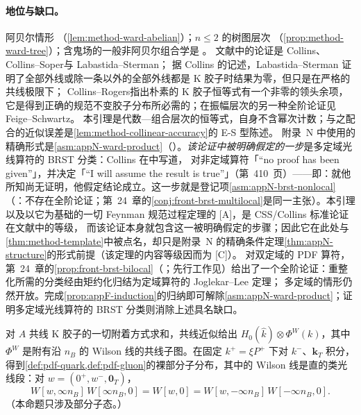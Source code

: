 \paragraph{地位与缺口。}阿贝尔情形 \tagR（\cref{lem:method-ward-abelian}）；$n\le2$ 的树图层次 \tagR（\cref{prop:method-ward-tree}）；含鬼场的一般非阿贝尔组合学是 \tagA。
文献中的论证是 Collins\cite[第~11.9~节，第~416~页，图~11.6]{Collins2011}、Collins--Soper\cite{CollinsSoper1982a}与 Labastida--Sterman\cite{Labastida:1984gy}；
据 Collins 的记述，Labastida--Sterman 证明了全部外线或除一条以外的全部外线都是 K 胶子时结果为零，但只是在严格的共线极限下；
Collins--Rogers\cite{Collins:2008sg}指出朴素的 K 胶子恒等式有一个非零的领头余项，它是得到正确的规范不变胶子分布所必需的；在振幅层次的另一种全阶论证见 Feige--Schwartz\cite{FeigeSchwartz2014}。
本引理是代数—组合层次的恒等式，自身不含幂次计数；与之配合的近似误差是\cref{lem:method-collinear-accuracy}的 E-S 型陈述。
附录~N 中使用的精确形式是\cref{asm:appN-ward-product}（\tagA）。\emph{该论证中被明确假定的一步}是多定域光线算符的 BRST 分类：Collins 在\cite[第~11.3.2~节，第~407--410~页]{Collins2011}中写道，
对非定域算符「“no proof has been given”」，并决定「“I will assume the result is true”」（第~410~页）——即：就他所知尚无证明，他假定结论成立。这一步就是登记项\cref{asm:appN-brst-nonlocal}
（\tagC：不存在全阶论证；第~24~章的\cref{conj:front-brst-multilocal}是同一主张）。本引理以及以它为基础的一切 Feynman 规范过程定理的 [A]，是 CSS/Collins 标准论证在文献中的等级，
而该论证本身就包含这一被明确假定的步骤；因此它在此处与\cref{thm:method-template}中被点名，却只是附录~N 的精确条件定理\cref{thm:appN-structure}的形式前提（该定理的内容等级因而为 [C]）。
对双定域的 PDF 算符，第~24~章的\cref{prop:front-brst-bilocal}（\tagA；先行工作见\cite{Braun:2019qtp}）给出了一个全阶论证：重整化所需的分类经由矩约化归结为定域算符的 Joglekar--Lee 定理；
多定域的情形仍然开放。完成\cref{prop:appF-induction}的归纳即可解除\cref{asm:appN-ward-product}；证明多定域光线算符的 BRST 分类则消除上述具名缺口。

\begin{proposition}\label{prop:method-collinear-wilson}
对 $A$ 共线 K 胶子的一切附着方式求和，共线近似给出 $H_0(\hat k)\otimes\Phi^W(k)$，其中 $\Phi^W$ 是附有沿 $n_B$ 的 Wilson 线的共线子图。在固定 $k^+=\xi P^+$ 下对 $k^-$、$\mathbf k_T$ 积分，
得到\cref{def:pdf-quark,def:pdf-gluon}的裸部分子分布，其中的 Wilson 线是直的类光线段：对 $w=(0^+,w^-,\mathbf 0_T)$，
\begin{equation}\label{eq:method-straight}
W[w,\infty n_B]\,W[\infty n_B,0]=W[w,0]=W[w,-\infty n_B]\,W[-\infty n_B,0] .
\end{equation}
（本命题只涉及部分子态。）
\end{proposition}


